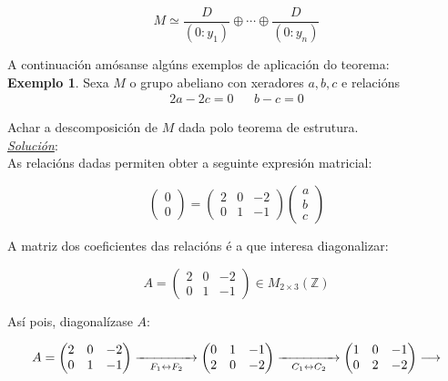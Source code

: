 \documentclass[twoside]{report}
\theoremstyle{mystyle}
\begin{document}
$$M \simeq \displaystyle \frac{D}{(0: y_{1})} \oplus \cdots \oplus \frac{D}{(0:y_{n})}$$

\vspace{5mm}

\noindent A continuación amósanse algúns exemplos de aplicación do teorema:\\

\noindent \textbf{Exemplo 1}. Sexa $M$ o grupo abeliano con xeradores $a,b,c$ e relacións
    \begin{align*}
        2a - 2c = 0 & & b-c = 0
    \end{align*}
    
\noindent Achar a descomposición de $M$ dada polo teorema de estrutura.\\

\noindent \textit{\underline{Solución}}:\\

\noindent As relacións dadas permiten obter a seguinte expresión matricial:

$$
\begin{pmatrix}
0 \\ 0 
\end{pmatrix}
=
\begin{pmatrix}
2 & 0 & -2 \\
0 & 1 & -1
\end{pmatrix}
\begin{pmatrix}
a \\ b \\ c
\end{pmatrix}
$$

\noindent A matriz dos coeficientes das relacións é a que interesa diagonalizar:

$$
A = \begin{pmatrix}
2 & 0 & -2 \\
0 & 1 & -1
\end{pmatrix}
\in M_{2 \times 3}(\mathbb{Z})
$$

\noindent Así pois, diagonalízase $A$:

$$
A = \begin{pmatrix}
2 & 0 & -2 \\
0 & 1 & -1
\end{pmatrix}
\underset{F_{1} \leftrightarrow F_{2}}{\xrightarrow{\hspace{15mm}}}
\begin{pmatrix}
0 & 1 & -1 \\
2 & 0 & -2
\end{pmatrix}
\underset{C_{1} \leftrightarrow C_{2}}{\xrightarrow{\hspace{15mm}}}
\begin{pmatrix}
1 & 0 & -1 \\
0 & 2 & -2
\end{pmatrix}
\longrightarrow
$$
\end{document}
